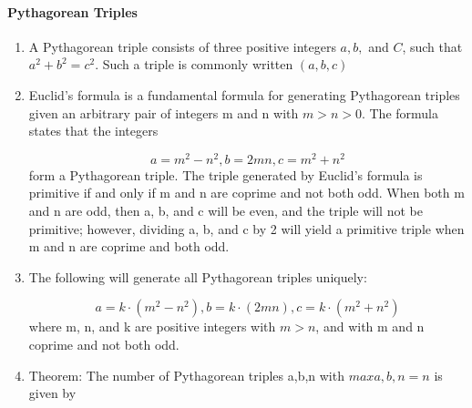 \paragraph{Pythagorean Triples}\begin{enumerate}

            
            \item A Pythagorean triple consists of three positive integers $\displaystyle a, b,$ and $\displaystyle C$,
                such
                that
                $\displaystyle a^{2}+b^{2}=c^{2}$. Such a triple is commonly written $\displaystyle (a, b, c)$
            \item 
                Euclid’s formula is a fundamental formula for generating Pythagorean triples given an arbitrary pair
                    of
                    integers m and n with $m >n >0$. The formula states that the integers

                \[\displaystyle a = m^{2}-n^{2}, b = 2mn, c = m^{2}+n^{2}\]
                form a Pythagorean triple. The triple generated by Euclid’s formula is primitive if and only if m and
                    n
                    are
                    coprime and not both odd. When both m and n are odd, then a, b, and c will be even, and the triple
                    will
                    not
                    be primitive; however, dividing a, b, and c by 2 will yield a primitive triple when m and n are
                    coprime
                    and
                    both odd.

            
            \item 
                The following will generate all Pythagorean triples uniquely:

                \[\displaystyle a = k\cdot \left( m^{2}-n^{2}\right), b = k\cdot\left(2mn\right), c = k\cdot
                \left(m^{2}+n^{2}\right)\]
                where m, n, and k are positive integers with $m > n$, and with m and n coprime and not both odd.
                

            
            \item 
                Theorem:
                    The number of Pythagorean triples
                    {a,b,n} with $max{a,b,n} = n$ is given by


\end{enumerate}
